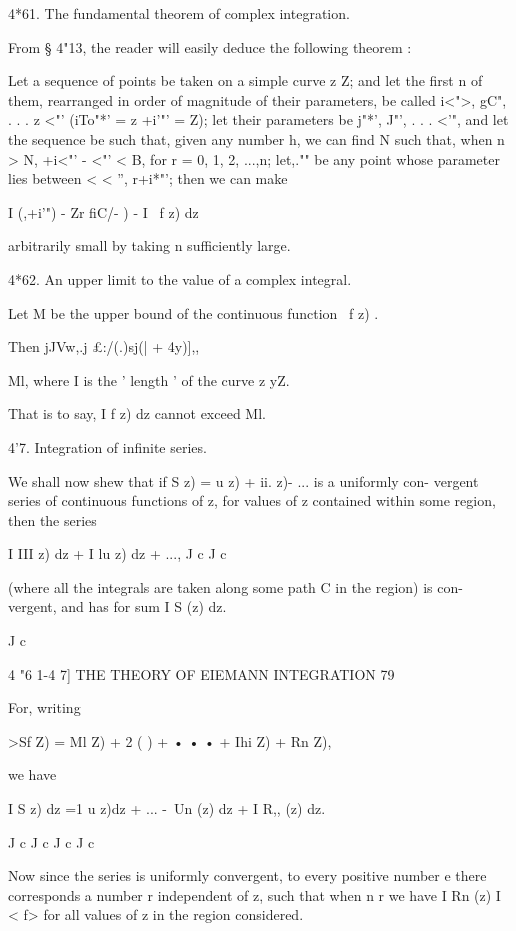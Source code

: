 4*61. The fundamental theorem of complex integration.

From § 4"13, the reader will easily deduce the following theorem :

Let a sequence of points be taken on a simple curve z Z; and let the
first n of them, rearranged in order of magnitude of their parameters,
be called i<">, gC", . . . z <"' (iTo"*' = z +i'"' = Z); let their
parameters be j"*', J"', . . . <'", and let the sequence be such that,
given any number h, we can find N such that, when n > N, +i<"' - <"' <
B, for r = 0, 1, 2, ...,n; let,."" be any point whose parameter lies
between < < '', r+i*"'; then we can make

I (,+i'") - Zr fiC/- ) - I \ f z) dz

arbitrarily small by taking n sufficiently large.

4*62. An upper limit to the value of a complex integral.

Let M be the upper bound of the continuous function \ f z) .

Then jJVw,.j £:/(.)sj(| + 4y)],,

 Ml, where I is the ' length ' of the curve z yZ.

That is to say, I f z) dz cannot exceed Ml.

4'7. Integration of infinite series.

We shall now shew that if S z) = u z) + ii. z)- ... is a uniformly
con- vergent series of continuous functions of z, for values of z
contained within some region, then the series

I III z) dz + I lu z) dz + ..., J c J c

(where all the integrals are taken along some path C in the region) is
con- vergent, and has for sum I S (z) dz.

J c



4 "6 1-4 7] THE THEORY OF EIEMANN INTEGRATION 79

For, writing

>Sf Z) = Ml Z) + 2 ( ) + • • • + Ihi Z) + Rn Z),

we have

I S z) dz =1 u z)dz + ... -\ Un (z) dz + I R,, (z) dz.

J c J c J c J c

Now since the series is uniformly convergent, to every positive number
e there corresponds a number r independent of z, such that when n r we
have I Rn (z) I < f> for all values of z in the region considered.

